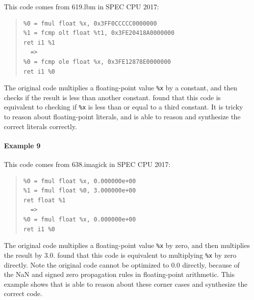 This code comes from 619.lbm in SPEC CPU 2017:


{\begin{quote}\begin{verbatim}
%0 = fmul float %x, 0x3FF0CCCCC0000000
%1 = fcmp olt float %t1, 0x3FE20418A0000000
ret i1 %1
  =>
%0 = fcmp ole float %x, 0x3FE12878E0000000
ret i1 %0
\end{verbatim}
\end{quote}}

The original code multiplies a floating-point value \texttt{\%x} by a
constant, and then checks if the result is less than another constant.
\minotaur{} found that this code is equivalent to checking if \texttt{\%x}
is less than or equal to a third constant.
It is tricky to reason about floating-point literals, and \minotaur{} is able to
reason and synthesize the correct literals correctly.

\paragraph*{Example 9}

This code comes from 638.imagick in SPEC CPU 2017:

{\begin{quote}\begin{verbatim}
%0 = fmul float %x, 0.000000e+00
%1 = fmul float %0, 3.000000e+00
ret float %1
  =>
%0 = fmul float %x, 0.000000e+00
ret i1 %0
\end{verbatim}
\end{quote}}

The original code multiplies a floating-point value \texttt{\%x} by
zero, and then multiplies the result by 3.0. \minotaur{} found that this
code is equivalent to multiplying \texttt{\%x} by zero directly.
Note the original code cannot be optimized to 0.0 directly, because of
the NaN and signed zero propagation rules in floating-point arithmetic.
This example shows that \minotaur{} is able to reason about these corner
cases and synthesize the correct code.







